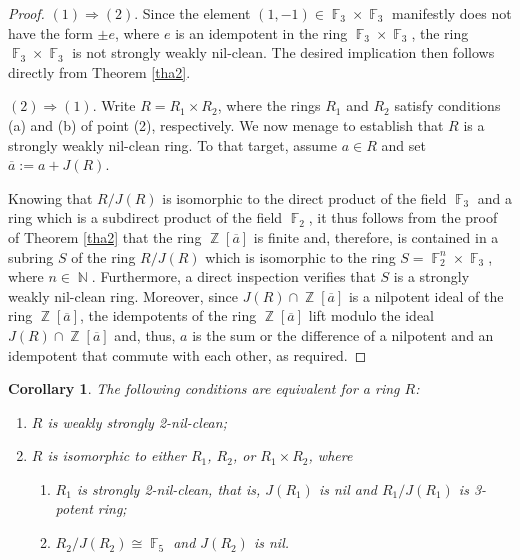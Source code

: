\documentclass{amsart}
\DeclareMathOperator{\N}{\mathbb{N}}
\DeclareMathOperator{\Z}{\mathbb{Z}}
\DeclareMathOperator{\F}{\mathbb{F}}
\newtheorem{corollary}[theorem]{Corollary}
\theoremstyle{definition}
\theoremstyle{remark}
\numberwithin{equation}{section}
\begin{document}
\begin{proof}
$(1) \Rightarrow (2)$. Since the element $(1, -1)\in \F_3\times \F_3$ manifestly does not have the form $\pm e$, where $e$ is an idempotent in the ring $\F_3\times \F_3$, the ring $\F_3\times \F_3$ is not strongly weakly nil-clean. The desired implication then follows directly from Theorem \ref{tha2}.

$(2) \Rightarrow (1)$. Write $R=R_1\times R_2$, where the rings $R_1$ and $R_2$ satisfy conditions (a) and (b) of point (2), respectively. We now menage to establish that $R$ is a strongly weakly nil-clean ring. To that target, assume $a\in R$ and set $\overline{a}:=a+J(R)$.

Knowing that $R/J(R)$ is isomorphic to the direct product of the field $\F_3$ and a ring which is a subdirect product of the field $\F_2$, it thus follows from the proof of Theorem \ref{tha2} that the ring $\Z[\overline{a}]$ is finite and, therefore, is contained in a subring $S$ of the ring $R/J(R)$ which is isomorphic to the ring $S=\F_2^{n}\times \F_3$, where $n\in \N$. Furthermore, a direct inspection verifies that $S$ is a strongly weakly nil-clean ring. Moreover, since $J(R)\cap \Z[\overline{a}]$ is a nilpotent ideal of the ring $\Z[\overline{a}]$, the idempotents of the ring $\Z[\overline{a}]$ lift modulo the ideal $J(R)\cap \Z[\overline{a}]$ and, thus, $a$ is the sum or the difference of a
nilpotent and an idempotent that commute with each other, as required.
\end{proof}

\begin{corollary} \cite[Theorem 2.26]{DM26}
The following conditions are equivalent for a ring $R$:
\begin{enumerate}

\item[(1)] $R$ is weakly strongly 2-nil-clean;
\item[(2)] $R$ is isomorphic to either $R_1$, $R_2$, or $R_1\times R_2$, where
\begin{enumerate}
\item[(i)] $R_1$ is strongly 2-nil-clean, that is, $J(R_1)$ is nil and $R_1/J(R_1)$ is 3-potent ring;
\item[(ii)] $R_2/J(R_2)\cong \F_5$ and $J(R_2)$ is nil.
\end{enumerate}

\end{enumerate}
\end{corollary}
\end{document}
